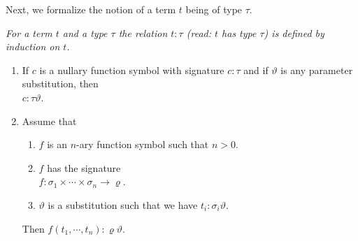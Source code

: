 \noindent
Next, we formalize the notion of a term $t$ being of type $\tau$.
\begin{Definition}[$t:\tau$]  \lb
{\em
  For a term  $t$ and a type $\tau$ the relation $t: \tau$ 
  (read: $t$ has type $\tau$) is defined by induction on  $t$.
  \begin{enumerate}
  \item If $c$ is a nullary function symbol with signature $c: \tau$ and if
        $\vartheta$ is any  parameter substitution, then
        \\[0.2cm]
        \hspace*{1.3cm} $c: \tau\vartheta$.
  \item Assume that
        \begin{enumerate}
        \item  $f$ is an  $n$-ary function symbol such that $n > 0$.
        \item  $f$ has the signature
               \\[0.2cm]
               \hspace*{1.3cm}
               $f: \sigma_1 \times \cdots \times \sigma_n \rightarrow \varrho$.
        \item $\vartheta$ is a substitution such that we have $t_i:\sigma_i\vartheta$.
        \end{enumerate}
        Then  $f(t_1, \cdots, t_n): \varrho\vartheta$.
  \end{enumerate}
}  
\end{Definition}

